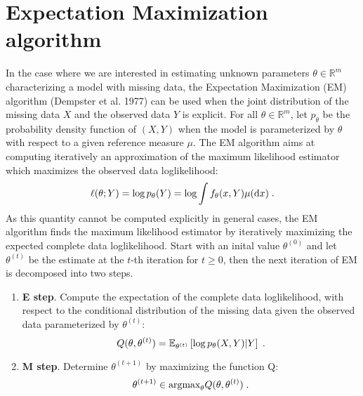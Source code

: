 \section{Expectation Maximization algorithm}
\label{ex:em}
In the case where we are interested in estimating unknown parameters $\theta\in\mathbb{R}^m$ characterizing a model with missing data, the Expectation Maximization (EM) algorithm (Dempster et al. 1977) can be used when the joint distribution of the missing data $X$ and the observed data $Y$ is explicit. For all $\theta\in\mathbb{R}^m$, let $p_{\theta}$ be the probability density function of $(X,Y)$ when the model is parameterized by $\theta$ with respect to a given reference measure $\mu$. The EM algorithm aims at computing iteratively an approximation of the maximum likelihood estimator which maximizes the observed data loglikelihood:
$$
\ell(\theta;Y) = \log p_{\theta}(Y) =\log \int f_{\theta}(x,Y)\mu(\mathrm{d}x)\;.
$$
As this quantity cannot be computed explicitly in general cases, the EM algorithm finds the maximum likelihood estimator by iteratively maximizing the expected complete data loglikelihood.
Start with an inital value $\theta^{(0)}$ and let $\theta^{(t)}$ be the estimate at the $t$-th iteration for $t\geqslant 0$, then the next iteration of EM is decomposed into two steps.
\begin{enumerate}
\item {\bf E step}. Compute the expectation of the complete data loglikelihood, with respect to the conditional distribution of the missing data given the observed data parameterized by $\theta^{(t)}$:
$$
Q(\theta,\theta^{(t)}) =\mathbb{E}_{\theta^{(t)}}\left[\log p_{\theta}(X,Y)|Y \right]\eqsp.%
$$
\item {\bf M step}. Determine $\theta^{(t+1)}$ by maximizing the function Q:
$$
\theta^{(t+1)}\in \mbox{argmax}_\theta Q(\theta,\theta^{(t)})\;.
$$
\end{enumerate}
